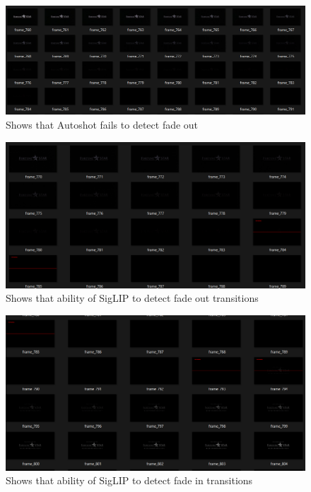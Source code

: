 \documentclass[12pt]{report}
\begin{document}
\begin{figure}[h]  %
	\centering
	\includegraphics[width=\linewidth]{autoshot_fade_out.png}  %
	\caption{Shows that Autoshot fails to detect fade out}
	\label{fig:auto_shot_fade_out}
\end{figure}


\begin{figure}[h]  %
	\centering
	\includegraphics[width=\linewidth]{fade_out.png}  %
	\caption{Shows that ability of SigLIP to detect fade out transitions}
	\label{fig:siglip_fade_out}
\end{figure}

\begin{figure}[h]  %
	\centering
	\includegraphics[width=\linewidth]{siglip_fade_in_transition.png}  %
	\caption{Shows that ability of SigLIP to detect fade in transitions}
	\label{fig:siglip_fade_in}
\end{figure}
\end{document}
